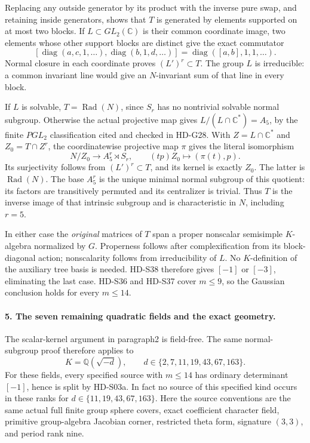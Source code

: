 Replacing any outside generator by its product with the inverse
pure swap, and retaining inside generators, shows that \(T\)
is generated by elements supported on at most two blocks.
If \(L\subset GL_2(\mathbb C)\) is their common coordinate
image, two elements whose other support blocks are distinct
give the exact commutator
\[
 [\operatorname{diag}(a,c,1,\ldots),
   \operatorname{diag}(b,1,d,\ldots)]
          =\operatorname{diag}([a,b],1,1,\ldots).
                                                               \tag{S40.10}
\]
Normal closure in each coordinate proves \((L')^r\subset T\).
The group \(L\) is irreducible: a common invariant line
would give an \(N\)-invariant sum of that line in every
block.

If \(L\) is solvable, \(T=\operatorname{Rad}(N)\), since
\(S_r\) has no nontrivial solvable normal subgroup.
Otherwise the actual projective map gives
\(L/(L\cap\mathbb C^*)=A_5\), by the finite \(PGL_2\)
classification cited and checked in HD-G28.
With \(Z=L\cap\mathbb C^*\) and \(Z_0=T\cap Z^r\),
the coordinatewise projective map \(\pi\) gives the literal
isomorphism
\[
 N/Z_0\longrightarrow A_5^r\rtimes S_r,\qquad
                    (tp)Z_0\longmapsto(\pi(t),p).            \tag{S40.11}
\]
Its surjectivity follows from \((L')^r\subset T\), and
its kernel is exactly \(Z_0\). The latter is
\(\operatorname{Rad}(N)\). The base \(A_5^r\) is the
unique minimal normal subgroup of this quotient: its factors
are transitively permuted and its centralizer is trivial.
Thus \(T\) is the inverse image of that intrinsic subgroup
and is characteristic in \(N\), including \(r=5\).

In either case the \emph{original} matrices of \(T\) span
a proper nonscalar semisimple \(K\)-algebra normalized by
\(G\). Properness follows after complexification from its
block-diagonal action; nonscalarity follows from irreducibility
of \(L\). No \(K\)-definition of the auxiliary tree basis
is needed. HD-S38 therefore gives \([-1]\) or \([-3]\),
eliminating the last case. HD-S36 and HD-S37 cover \(m\le9\),
so the Gaussian conclusion holds for every \(m\le14\).

\paragraph{5. The seven remaining quadratic fields and the exact geometry.}
The scalar-kernel argument in paragraph2 is field-free. The
same normal-subgroup proof therefore applies to
\[
 K=\mathbb Q(\sqrt{-d}),\qquad
                 d\in\{2,7,11,19,43,67,163\}.              \tag{S40.12}
\]
For these fields, every specified source with \(m\le14\)
has ordinary determinant \([-1]\), hence is split by
HD-S03a. In fact no source of this specified kind occurs in
these ranks for \(d\in\{11,19,43,67,163\}\).
Here the source conventions are the same actual full finite
group sphere covers, exact coefficient character field,
primitive group-algebra Jacobian corner, restricted theta form,
signature \((3,3)\), and period rank nine.

